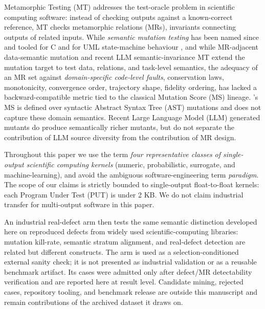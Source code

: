 \documentclass[manuscript,screen,review]{acmart}
\begin{document}
Metamorphic Testing (MT) addresses the test-oracle problem in scientific
computing software: instead of checking outputs against a known-correct
reference, MT checks metamorphic relations (MRs), invariants connecting
outputs of related inputs. While \emph{semantic mutation testing} has
been named since \citet{7a6c280d9584691800e71876c716ea229335abeb} and tooled for C \citep{dan2012smtc}
and for UML state-machine behaviour \citep{derezinska2019uml}, and while
MR-adjacent data-semantic mutation \citep{sun2016mumt,sun2024datamutation,zhu2020datamorphic,chan2024metamorphic}
and recent LLM semantic-invariance MT \citep{0fa97cc4e2a0ffb6a777669b1b541c0372fac0d2} extend the mutation target
to test data, relations, and task-level semantics, the adequacy of an MR
set against \emph{domain-specific code-level faults}, conservation laws,
monotonicity, convergence order, trajectory shape, fidelity ordering,
has lacked a backward-compatible metric tied to the classical Mutation
Score (MS) lineage. \citeauthor{d7c38286734419b52de4262c9802ebdfcf4b9447}'s \citeyearpar{d7c38286734419b52de4262c9802ebdfcf4b9447} MS is defined over syntactic
Abstract Syntax Tree (AST) mutations and does not capture these domain
semantics. Recent Large Language Model (LLM) generated mutants \citep{tip2025llmorpheus,humbatova2021deepcrime} do
produce semantically richer mutants, but do not separate the
contribution of LLM source diversity from the contribution of MR design.

Throughout this paper we use the term \emph{four representative classes
of single-output scientific computing kernels} (numeric, probabilistic,
surrogate, and machine-learning), and avoid the ambiguous
software-engineering term \emph{paradigm}. The scope of our claims is
strictly bounded to single-output float-to-float kernels: each
Program Under Test (PUT) is under 2 KB. We do not claim industrial transfer
for multi-output software in this paper.

An industrial real-defect arm then tests the same semantic
distinction developed here on reproduced defects from widely used
scientific-computing libraries: mutation kill-rate, semantic stratum
alignment, and real-defect detection are related but different
constructs. The arm is used as a selection-conditioned external sanity
check; it is not presented as industrial validation or as a reusable benchmark artifact. Its cases
were admitted only after defect/MR detectability verification and are
reported here at result level. Candidate mining, rejected cases,
repository tooling, and benchmark release are outside this manuscript
and remain contributions of the archived dataset it draws on.
\end{document}

